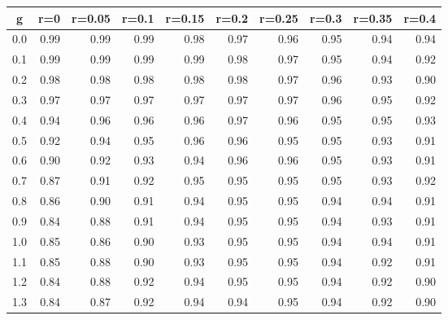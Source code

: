 %
\begin{table}[!tbp]
 \begin{center}
 \begin{tabular}{rrrrrrrrrr}\hline\hline
\multicolumn{1}{c}{g}&\multicolumn{1}{c}{r=0}&\multicolumn{1}{c}{r=0.05}&\multicolumn{1}{c}{r=0.1}&\multicolumn{1}{c}{r=0.15}&\multicolumn{1}{c}{r=0.2}&\multicolumn{1}{c}{r=0.25}&\multicolumn{1}{c}{r=0.3}&\multicolumn{1}{c}{r=0.35}&\multicolumn{1}{c}{r=0.4}\tabularnewline
\hline
0.0&0.99&0.99&0.99&0.98&0.97&0.96&0.95&0.94&0.94\tabularnewline
0.1&0.99&0.99&0.99&0.99&0.98&0.97&0.95&0.94&0.92\tabularnewline
0.2&0.98&0.98&0.98&0.98&0.98&0.97&0.96&0.93&0.90\tabularnewline
0.3&0.97&0.97&0.97&0.97&0.97&0.97&0.96&0.95&0.92\tabularnewline
0.4&0.94&0.96&0.96&0.96&0.97&0.96&0.95&0.95&0.93\tabularnewline
0.5&0.92&0.94&0.95&0.96&0.96&0.95&0.95&0.93&0.91\tabularnewline
0.6&0.90&0.92&0.93&0.94&0.96&0.96&0.95&0.93&0.91\tabularnewline
0.7&0.87&0.91&0.92&0.95&0.95&0.95&0.95&0.93&0.92\tabularnewline
0.8&0.86&0.90&0.91&0.94&0.95&0.95&0.94&0.94&0.91\tabularnewline
0.9&0.84&0.88&0.91&0.94&0.95&0.95&0.94&0.93&0.91\tabularnewline
1.0&0.85&0.86&0.90&0.93&0.95&0.95&0.94&0.94&0.91\tabularnewline
1.1&0.85&0.88&0.90&0.93&0.95&0.95&0.94&0.92&0.91\tabularnewline
1.2&0.84&0.88&0.92&0.94&0.95&0.95&0.94&0.92&0.90\tabularnewline
1.3&0.84&0.87&0.92&0.94&0.94&0.95&0.94&0.92&0.90\tabularnewline
\hline
\end{tabular}

\end{center}

\end{table}

